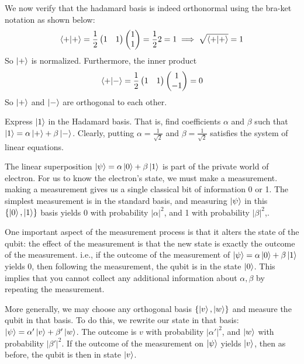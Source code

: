 \begin{example}
    We now verify that the hadamard basis is indeed orthonormal using the bra-ket notation as shown below:
    \[
    \braket{+|+}=\frac{1}{2} \begin{pmatrix} 1 & 1 \end{pmatrix} \begin{pmatrix} 1 \\ 1 \end{pmatrix} =\frac{1}{2}2=1\implies \sqrt{\braket{+|+}}=1
    \]
    So $\ket{+}$ is normalized. Furthermore, the inner product
    \[
    \braket{+|-}=\frac{1}{2}\begin{pmatrix} 1 & 1 \end{pmatrix} \begin{pmatrix} 1 \\ -1 \end{pmatrix} = 0
    \]
    So $\ket{+}$ and $\ket{-}$ are orthogonal to each other.
\end{example}

\begin{example}
    Express $\ket{1}$ in the Hadamard basis. That is, find coefficients $\alpha$ and $\beta$ such that $\ket{1}=\alpha\ket{+}+\beta\ket{-}$.
    Clearly, putting $\alpha=\frac{1}{\sqrt{2}}$ and $\beta=\frac{1}{\sqrt{2}}$ satisfies the system of linear equations.
\end{example}

The linear superposition $\ket{\psi}=\alpha\ket{0}+\beta \ket{1}$ is part of the private world of electron. For us to know the electron's state, we must make a measurement. making a measurement gives us a single classical bit of information 0 or 1. The simplest measurement is in the standard basis, and measuring $\ket{\psi}$ in this $\{\ket{0},\ket{1}\}$ basis yields 0 with probability $|\alpha|^2$, and 1 with probability $|\beta|^2$,.

One important aspect of the measurement process is that it alters the state of the qubit: the effect of the measurement is that the new state is exactly the outcome of the measurement. i.e., if the outcome of the measurement of $\ket{\psi}=\alpha \ket{0}+\beta\ket{1}$ yields 0, then following the measurement, the qubit is in the state $\ket{0}$. This implies that you cannot collect any additional information about $\alpha,\beta$ by repeating the measurement.

More generally, we may choose any orthogonal basis $\{\ket{v},\ket{w}\}$ and measure the qubit in that basis. To do this, we rewrite our state in that basis: $\ket{\psi}=\alpha'\ket{v}+\beta'\ket{w}$. The outcome is $v$ with probability $|\alpha'|^2$, and $\ket{w}$ with probability $|\beta'|^2$. If the outcome of the measurement on $\ket{\psi}$ yields $\ket{v}$, then as before, the qubit is then in state $\ket{v}$.

